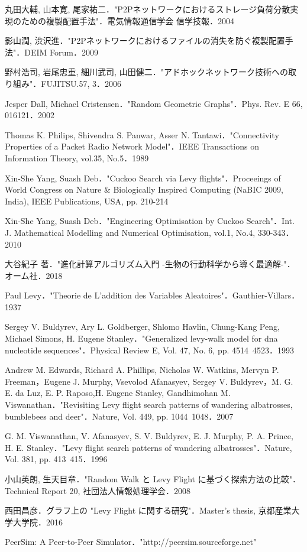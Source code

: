 \documentclass[11pt]{jreport}
\begin{document}

\begin{thebibliography}{99}

丸田大輔, 山本寛, 尾家祐二．"P2Pネットワークにおけるストレージ負荷分散実現のための複製配置手法"．電気情報通信学会 信学技報．2004

影山潤, 渋沢進．"P2Pネットワークにおけるファイルの消失を防ぐ複製配置手法"．DEIM Forum．2009

野村浩司, 岩尾忠重, 細川武司, 山田健二．"アドホックネットワーク技術への取り組み"．FUJITSU.57, 3．2006

Jesper Dall, Michael Cristensen．"Random Geometric Graphs"．Phys. Rev. E 66, 016121．2002

Thomas K. Philips, Shivendra S. Panwar, Asser N. Tantawi．"Connectivity Properties of a Packet Radio Network Model"．IEEE Transactions on Information Theory, vol.35, No.5．1989

Xin-She Yang, Suash Deb．"Cuckoo Search via Levy flights"．Proceeings of World Congress on Nature \& Biologically Inspired Computing (NaBIC 2009, India), IEEE Publications, USA, pp. 210-214

Xin-She Yang, Suash Deb．"Engineering Optimisation by Cuckoo Search"．Int. J. Mathematical Modelling and Numerical Optimisation, vol.1,  No.4, 330-343．2010

大谷紀子 著．"進化計算アルゴリズム入門 -生物の行動科学から導く最適解-"．オーム社．2018

Paul Levy．"Theorie de L’addition des Variables Aleatoires"．Gauthier-Villars．1937

Sergey V. Buldyrev, Ary L. Goldberger, Shlomo Havlin, Chung-Kang Peng, Michael Simons, H. Eugene Stanley．"Generalized levy-walk model for dna nucleotide sequences"．Physical Review E, Vol. 47, No. 6, pp. 4514~4523．1993

Andrew M. Edwards, Richard A. Phillips, Nicholas W. Watkins, Mervyn P. Freeman，Eugene J. Murphy, Vsevolod Afanasyev, Sergey V. Buldyrev，M. G. E. da Luz, E. P. Raposo,H. Eugene Stanley, Gandhimohan M. Viswanathan．"Revisiting Levy flight search patterns of wandering albatrosses, bumblebees and deer"．Nature, Vol. 449, pp. 1044~1048．2007

G. M. Viswanathan, V. Afanasyev, S. V. Buldyrev, E. J. Murphy, P. A. Prince, H. E. Stanley．"Levy flight search patterns of wandering albatrosses"．Nature, Vol. 381, pp. 413~415．1996

小山英朗, 生天目章．"Random Walk と Levy Flight に基づく探索方法の比較"． Technical Report 20, 社団法人情報処理学会．2008

西田昌彦．グラフ上の "Levy Flight に関する研究"．Master’s thesis, 京都産業大学大学院．2016

PeerSim: A Peer-to-Peer Simulator．"http://peersim.sourceforge.net"

\end{thebibliography}
\end{document}
